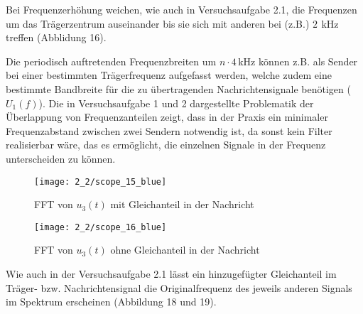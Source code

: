 \documentclass[a4paper, 12pt]{article}
\begin{document}
Bei Frequenzerhöhung weichen, wie auch in Versuchsaufgabe 2.1, die Frequenzen um
das Trägerzentrum auseinander bis sie sich mit anderen bei (z.B.) $2 \,\
\si{\kilo\hertz}$ treffen (Abblidung 16).

Die periodisch auftretenden Frequenzbreiten um $n \cdot 4 \, \si{\kilo\hertz}$ können z.B. als Sender bei
einer bestimmten Trägerfrequenz aufgefasst werden, welche zudem eine bestimmte
Bandbreite für die zu übertragenden Nachrichtensignale benötigen ($U_1(f)$). Die in
Versuchsaufgabe 1 und 2 dargestellte Problematik der Überlappung von
Frequenzanteilen zeigt, dass in der Praxis ein minimaler Frequenzabstand zwischen zwei
Sendern notwendig ist, da sonst kein Filter realisierbar wäre, das es ermöglicht,
die einzelnen Signale in der Frequenz unterscheiden zu können. 

\begin{figure}[H]
\begin{center}
	\texttt{[image: 2\_2/scope\_15\_blue]}
	\caption{FFT von $u_3(t)$ mit Gleichanteil in der Nachricht}
\end{center}
\end{figure}

\begin{figure}[H]
\begin{center}
	\texttt{[image: 2\_2/scope\_16\_blue]}
	\caption{FFT von $u_3(t)$ ohne Gleichanteil in der Nachricht}
  \end{center}
\end{figure}
Wie auch in der Versuchsaufgabe 2.1 lässt ein hinzugefügter Gleichanteil im
Träger- bzw. Nachrichtensignal die Originalfrequenz des jeweils anderen Signals
im Spektrum erscheinen (Abbildung 18 und 19).
\end{document}
